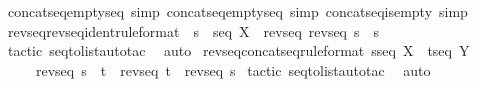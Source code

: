 \begin{isabellebody}
\isamarkupfalse%
\ concatseq{\isacharunderscore}emptyseq\ {\isacharbrackleft}simp{\isacharbrackright}\ concatseq{\isacharunderscore}emptyseq{}\ {\isacharbrackleft}simp{\isacharbrackright}\ concatseq{\isacharunderscore}is{\isacharunderscore}empty\ {\isacharbrackleft}simp{\isacharbrackright}\ \isanewline
\isanewline
\isanewline
\isanewline
\isanewline
\isanewline
\isanewline
\isanewline
{}\isamarkupfalse%
\ revseq{\isacharunderscore}revseq{\isacharunderscore}ident{\isacharbrackleft}rule{\isacharunderscore}format{\isacharbrackright}\ {\isacharcolon}\ {\isachardoublequoteopen}s\ {\isacharcolon}\ seq\ X\ {\isacharminus}{\isacharminus}{\isachargreater}\ {\isacharparenleft}revseq\ {\isacharparenleft}revseq\ s{\isacharparenright}{\isacharparenright}\ {\isacharequal}\ s{\isachardoublequoteclose}\isanewline
%
\isadelimproof
%
\endisadelimproof
%
\isatagproof
{}\isamarkupfalse%
\ {\isacharparenleft}tactic\ {\isacharverbatimopen}seq{\isacharunderscore}to{\isacharunderscore}list{\isacharunderscore}auto{\isacharunderscore}tac\ {}{\isacharverbatimclose}{\isacharparenright}\isanewline
{}\isamarkupfalse%
\ auto\isanewline
{}\isamarkupfalse%
%
\endisatagproof
{\isafoldproof}%
%
\isadelimproof
\isanewline
%
\endisadelimproof
\isanewline
{}\isamarkupfalse%
\ revseq{\isacharunderscore}concatseq{\isacharbrackleft}rule{\isacharunderscore}format{\isacharbrackright}{\isacharcolon}\ {\isachardoublequoteopen}s{\isacharcolon}seq\ X\ {\isacharminus}{\isacharminus}{\isachargreater}\ t{\isacharcolon}seq\ Y\ {\isacharminus}{\isacharminus}{\isachargreater}\ \ \isanewline
\ \ \ \ \ {\isacharparenleft}revseq\ {\isacharparenleft}s\ {\isacharpercent}{\isacharampersand}{\isacharcircum}\ t{\isacharparenright}{\isacharparenright}\ {\isacharequal}\ {\isacharparenleft}{\isacharparenleft}revseq\ t{\isacharparenright}\ {\isacharpercent}{\isacharampersand}{\isacharcircum}\ {\isacharparenleft}revseq\ s{\isacharparenright}{\isacharparenright}{\isachardoublequoteclose}\isanewline
%
\isadelimproof
%
\endisadelimproof
%
\isatagproof
{}\isamarkupfalse%
\ {\isacharparenleft}tactic\ {\isacharverbatimopen}seq{\isacharunderscore}to{\isacharunderscore}list{\isacharunderscore}auto{\isacharunderscore}tac\ {}{\isacharverbatimclose}{\isacharparenright}\isanewline
{}\isamarkupfalse%
\ auto\isanewline
{}\isamarkupfalse%
%
\endisatagproof
{\isafoldproof}%
%
\isadelimproof
\isanewline
%
\endisadelimproof
\isanewline
\isanewline
\isanewline

\end{isabellebody}
